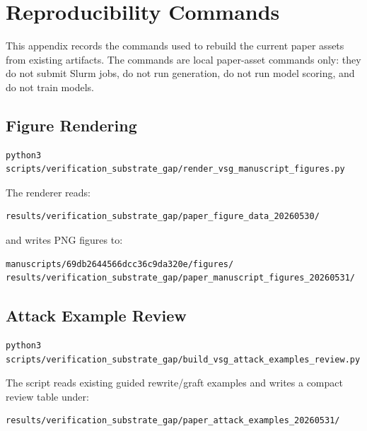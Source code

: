\section{Reproducibility Commands}
\label{app:reproducibility-commands}

This appendix records the commands used to rebuild the current paper assets
from existing artifacts.  The commands are local paper-asset commands only:
they do not submit Slurm jobs, do not run generation, do not run model scoring,
and do not train models.

\subsection{Figure Rendering}

\begingroup\footnotesize
\begin{verbatim}
python3 scripts/verification_substrate_gap/render_vsg_manuscript_figures.py
\end{verbatim}
\endgroup

The renderer reads:

\begingroup\footnotesize
\begin{verbatim}
results/verification_substrate_gap/paper_figure_data_20260530/
\end{verbatim}
\endgroup

and writes PNG figures to:

\begingroup\footnotesize
\begin{verbatim}
manuscripts/69db2644566dcc36c9da320e/figures/
results/verification_substrate_gap/paper_manuscript_figures_20260531/
\end{verbatim}
\endgroup

\subsection{Attack Example Review}

\begingroup\footnotesize
\begin{verbatim}
python3 scripts/verification_substrate_gap/build_vsg_attack_examples_review.py
\end{verbatim}
\endgroup

The script reads existing guided rewrite/graft examples and writes a compact
review table under:

\begingroup\footnotesize
\begin{verbatim}
results/verification_substrate_gap/paper_attack_examples_20260531/
\end{verbatim}
\endgroup

